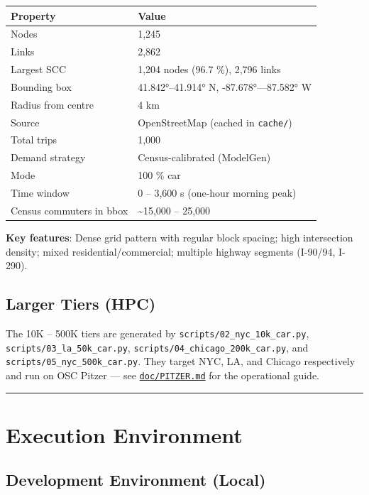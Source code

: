 \begin{longtable}[]{@{}ll@{}}
\toprule\noalign{}
Property & Value \\
\midrule\noalign{}
\endhead
\bottomrule\noalign{}
\endlastfoot
Nodes & 1,245 \\
Links & 2,862 \\
Largest SCC & 1,204 nodes (96.7 \%), 2,796 links \\
Bounding box & 41.842°--41.914° N, -87.678°---87.582° W \\
Radius from centre & 4 km \\
Source & OpenStreetMap (cached in \texttt{cache/}) \\
Total trips & 1,000 \\
Demand strategy & Census-calibrated (ModelGen) \\
Mode & 100 \% car \\
Time window & 0 -- 3,600 s (one-hour morning peak) \\
Census commuters in bbox & \textasciitilde15,000 -- 25,000 \\
\end{longtable}

\textbf{Key features}: Dense grid pattern with regular block spacing;
high intersection density; mixed residential/commercial; multiple
highway segments (I-90/94, I-290).

\subsection{Larger Tiers (HPC)}\label{422-larger-tiers-hpc}

The 10K -- 500K tiers are generated by
\texttt{scripts/02\_nyc\_10k\_car.py},
\texttt{scripts/03\_la\_50k\_car.py},
\texttt{scripts/04\_chicago\_200k\_car.py}, and
\texttt{scripts/05\_nyc\_500k\_car.py}. They target NYC, LA, and Chicago
respectively and run on OSC Pitzer --- see
\href{../PITZER.md}{\texttt{doc/PITZER.md}} for the operational guide.

\begin{center}\rule{0.5\linewidth}{0.5pt}\end{center}

\section{Execution Environment}\label{43-execution-environment}

\subsection{Development Environment
(Local)}\label{431-development-environment-local}

